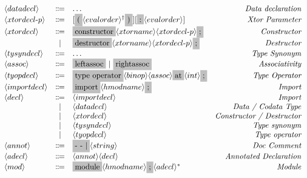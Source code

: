 \documentclass[11pt]{article}
\newcommand{\nonterminal}[1]{\langle #1 \rangle}
\newcommand{\terminal}[1]{\colorbox{lightgray}{\vphantom{X}#1}}
\newcommand{\commalist}[1]{#1^{\dagger}}
\begin{document}
\[
  \begin{array}{lclr}
    \nonterminal{datadecl} & \Coloneqq & \ldots & \emph{Data declaration} \\
    \nonterminal{xtordecl$-$p} & \Coloneqq & [\terminal{(} \commalist{\nonterminal{evalorder}} \terminal{)}] [\terminal{:} \nonterminal{evalorder}] & \emph{Xtor Parameter} \\
    \nonterminal{xtordecl} & \Coloneqq & \terminal{constructor} \nonterminal{xtorname} \nonterminal{xtordecl$-$p}\terminal{;} & \emph{Constructor} \\
    & | & \terminal{destructor} \nonterminal{xtorname}\nonterminal{xtordecl$-$p} \terminal{;} & \emph{Destructor} \\
    \nonterminal{tysyndecl} & \Coloneqq & \ldots & \emph{Type Synonym} \\
    \nonterminal{assoc} & \Coloneqq & \terminal{leftassoc}\ |\ \terminal{rightassoc} & \emph{Associativity} \\
    \nonterminal{tyopdecl} & \Coloneqq & \terminal{type operator} \nonterminal{binop} \nonterminal{assoc} \terminal{at} \nonterminal{int} \terminal{;} & \emph{Type Operator} \\
    \nonterminal{importdecl} & \Coloneqq & \terminal{import} \nonterminal{hmodname}\terminal{;} & \emph{Import} \\
    \nonterminal{decl} & \Coloneqq & \nonterminal{importdecl}  & \emph{Import} \\
    & | & \nonterminal{datadecl} & \emph{Data / Codata Type} \\
    & | & \nonterminal{xtordecl} & \emph{Constructor / Destructor} \\
    & | & \nonterminal{tysyndecl} & \emph{Type synonym} \\
    & | & \nonterminal{tyopdecl} & \emph{Type operator} \\
    \nonterminal{annot} & \Coloneqq & \terminal{- - $|$} \nonterminal{string} & \emph{Doc Comment} \\
    \nonterminal{adecl} & \Coloneqq & \nonterminal{annot}\nonterminal{decl} & \emph{Annotated Declaration} \\
    \nonterminal{mod} & \Coloneqq & \terminal{module} \nonterminal{hmodname} \terminal{;} \nonterminal{adecl}^{\ast}& \emph{Module}
  \end{array}
\]
\end{document}

